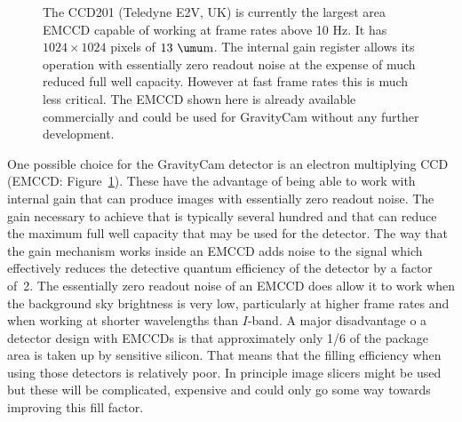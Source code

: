 \documentclass{pasa}%
\begin{document}
\begin{figure}
\centering
{}
 \caption{The CCD201 (Teledyne E2V, UK) is currently the largest area EMCCD capable of working at frame rates above 10 Hz.  It has $1024 \times 1024$ pixels of $13~\umu\mbox{m}$.  The internal gain register allows its operation with essentially zero readout noise at the expense of much reduced full well capacity.  However at fast frame rates this is much less critical. The EMCCD shown here is already available commercially and could be used for GravityCam without any further development.}
\label{fig:EMCCD}
\end{figure}


 One possible choice for the \mbox{GravityCam} detector is an electron multiplying CCD (EMCCD: Figure~\ref{fig:EMCCD}).  These have the advantage of being able to work with internal gain that can produce images with essentially zero readout noise.  The gain necessary to achieve that is typically several hundred and that can reduce the maximum full well capacity that may be used for the detector.  The way that the gain mechanism works inside an EMCCD adds noise to the signal which effectively reduces the detective quantum efficiency of the detector by a factor of~2.  The essentially zero readout noise of an EMCCD does allow it to work when the background sky brightness is very low, particularly at higher frame rates and when working at shorter wavelengths than $I$-band.  A major disadvantage o a detector design with EMCCDs is that approximately only 1/6 of the package area is taken up by sensitive silicon.  That means that the filling efficiency when using those detectors is relatively poor. In principle image slicers might be
used but these will be complicated, expensive and could only go some way
towards improving this fill factor.
\end{document}
